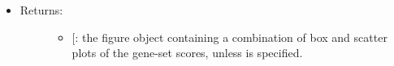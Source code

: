 \documentclass[letterpaper,10pt,english]{sphinxmanual}
\begin{document}
\begin{fulllineitems}
\begin{itemize}
\begin{description}
\begin{itemize}
\end{itemize}

\end{description}

\item {} \begin{description}
\item[{Returns:}] \leavevmode\begin{itemize}
\item {} 
{[}\sphinxstyleemphasis{matplotlib.figure.Figure}{]}: the figure object containing a
combination of box and scatter plots of the gene-set scores,
unless  is specified.

\end{itemize}

\end{description}

\end{itemize}

\end{fulllineitems}

\end{document}

